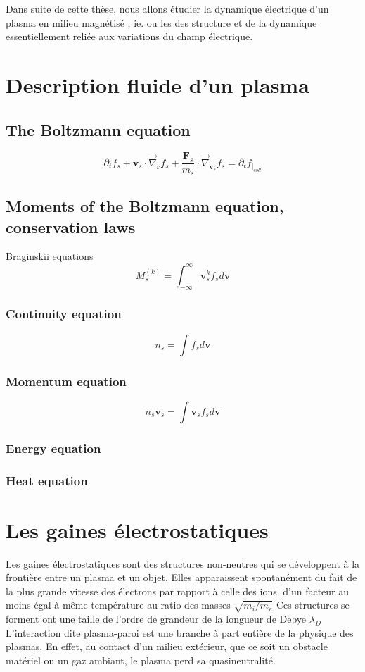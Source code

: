 			
			
			Dans suite de cette thèse, nous allons étudier la dynamique électrique d'un plasma en milieu magnétisé
			, ie. ou les 
			des structure et de la dynamique essentiellement reliée aux variations du champ électrique.
	\section{Description fluide d'un plasma}
		
		\subsection{The Boltzmann equation}
			$$\partial_tf_s+\mathbf{v}_s\cdot\vec\nabla_\mathbf{r}f_s+\frac{\mathbf{F}_s}{m_s}\cdot\vec\nabla_{\mathbf{v}_s}f_s=\partial_tf_{|_{coll}}$$
		\subsection{Moments of the Boltzmann equation, conservation laws}
			Braginskii equations
			$$M^{(k)}_s=\int_{-\infty}^{\infty}\mathbf{v}_s^kf_sd\mathbf{v}$$
			\subsubsection{Continuity equation}
			$$n_s=\int f_sd\mathbf{v}$$
			
			\subsubsection{Momentum equation}
			$$n_s\mathbf{v}_s=\int \mathbf{v}_sf_sd\mathbf{v}$$
			\subsubsection{Energy equation}
			\subsubsection{Heat equation}
	\section{Les gaines électrostatiques}
			Les gaines électrostatiques sont des structures non-neutres qui se
			développent à la frontière entre un plasma et un objet. Elles apparaissent
			spontanément du fait de la plus grande vitesse des électrons par rapport à
			celle des ions.  d'un facteur au moins égal à même température au ratio des
			masses $\sqrt{m_i/m_e}$ Ces structures se forment ont une taille de l'ordre de grandeur de la longueur de Debye $\lambda_D$
			L'interaction dite plasma-paroi est une branche à part entière de la physique des plasmas.
			En effet, au contact d'un milieu extérieur, que ce soit un obstacle matériel
			ou un gaz ambiant, le plasma perd sa quasineutralité.
